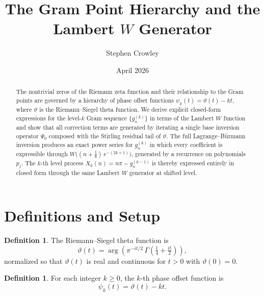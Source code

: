 \documentclass[11pt]{article}
\title{The Gram Point Hierarchy and the Lambert $W$ Generator}
\author{Stephen Crowley}
\date{April 2026}
\theoremstyle{definition}
\newtheorem{definition}[theorem]{Definition}
\begin{document}
\maketitle

\begin{abstract}
The nontrivial zeros of the Riemann zeta function and their relationship
to the Gram points are governed by a hierarchy of phase offset functions
$\psi_k(t) = \vartheta(t) - kt$, where $\vartheta$ is the Riemann--Siegel
theta function. We derive explicit closed-form expressions for the
level-$k$ Gram sequence $\{g_n^{(k)}\}$ in terms of the Lambert $W$
function and show that all correction terms are generated by iterating
a single base inversion operator $\Psi_0$ composed with the Stirling
residual tail of $\vartheta$. The full Lagrange--B\"urmann inversion
produces an exact power series for $g_n^{(k)}$ in which every
coefficient is expressible through
$W\!\bigl((n+\tfrac{1}{8})\,e^{-(2k+1)}\bigr)$, generated by a
recurrence on polynomials $p_j$. The $k$-th level process
$X_k(n) = n\pi - g_n^{(k-1)}$ is thereby expressed entirely in
closed form through the same Lambert $W$ generator at shifted level.
\end{abstract}

\section{Definitions and Setup}

\begin{definition}
The Riemann--Siegel theta function is
\begin{equation}
  \vartheta(t) = \arg\!\left(\pi^{-it/2}\,\Gamma\!\left(\tfrac{1}{4}
    + \tfrac{it}{2}\right)\right),
\end{equation}
normalized so that $\vartheta(t)$ is real and continuous for $t > 0$
with $\vartheta(0) = 0$.
\end{definition}

\begin{definition}
For each integer $k \ge 0$, the $k$-th phase offset function is
\begin{equation}
  \psi_k(t) = \vartheta(t) - kt.
\end{equation}
\end{definition}
\end{document}
